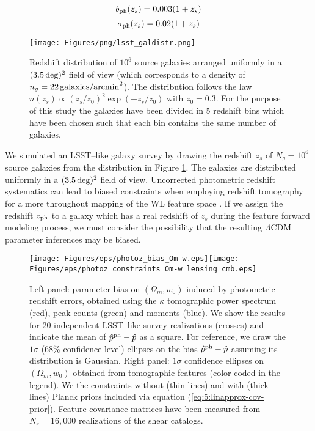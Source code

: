 \begin{equation}
\label{eq:7:bph}
b_{\rm ph}(z_s) = 0.003(1+z_s)
\end{equation}
%
\begin{equation}
\label{eq:7:sph}
\sigma_{\rm ph}(z_s) = 0.02(1+z_s)
\end{equation}
%
\begin{figure}
\begin{center}
\texttt{[image: Figures/png/lsst\_galdistr.png]}
\end{center}
\caption{Redshift distribution of $10^6$ source galaxies arranged uniformly in a $(3.5\,{\rm deg})^2$ field of view (which corresponds to a density of $n_g=22\,{\rm galaxies/arcmin}^2$). The distribution follows the law $n(z_s)\propto (z_s/z_0)^2\exp(-z_s/z_0)$ with $z_0=0.3$. For the purpose of this study the galaxies have been divided in 5 redshift bins which have been chosen such that each bin contains the same number of galaxies.}
\label{fig:7:galdistr}
\end{figure}
%
We simulated an LSST--like galaxy survey by drawing the redshift $z_s$ of $N_g=10^6$ source galaxies from the distribution in Figure \ref{fig:7:galdistr}. The galaxies are distributed uniformly in a $(3.5\,{\rm deg})^2$ field of view. Uncorrected photometric redshift systematics can lead to biased constraints when employing redshift tomography for a more throughout mapping of the WL feature space \citep{HutererWLSys,PetriPhotoZ}. If we assign the redshift $z_{\rm ph}$ to a galaxy which has a real redshift of $z_s$ during the feature forward modeling process, we must consider the possibility that the resulting $\Lambda$CDM parameter inferences may be biased. 
%
\begin{figure}
\begin{center}
\texttt{[image: Figures/eps/photoz\_bias\_Om-w.eps]}\texttt{[image: Figures/eps/photoz\_constraints\_Om-w\_lensing\_cmb.eps]}
\end{center}
\caption{Left panel: parameter bias on $(\Omega_m,w_0)$ induced by photometric redshift errors, obtained using the $\kappa$ tomographic power spectrum (red), peak counts (green) and moments (blue). We show the results for 20 independent LSST--like survey realizations (crosses) and indicate the mean of $\hat{p}^{\rm ph}-\hat{p}$ as a square. For reference, we draw the $1\sigma$ (68\% confidence level) ellipses on the bias $\hat{p}^{\rm ph}-\hat{p}$ assuming its distribution is Gaussian. Right panel: $1\sigma$ confidence ellipses on $(\Omega_m,w_0)$ obtained from tomographic features (color coded in the legend). We the constraints without (thin lines) and with (thick lines) Planck \citep{Planck15} priors included via equation (\ref{eq:5:linapprox-cov-prior}). Feature covariance matrices have been measured from $N_r=16,000$ realizations of the shear catalogs.}
\label{fig:7:photoz}
\end{figure}
